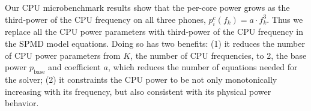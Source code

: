 Our CPU microbenchmark results show  that 
the per-core power grows as the third-power of the CPU
frequency on all three phones, 
\ie $p_i^c(f_k) = a\cdot f_k^3$. 
Thus we replace all the CPU power parameters with
third-power of the CPU frequency in the SPMD model equations.
%
Doing so has two benefits: (1) it reduces the number of CPU power
parameters from $K$, the number of CPU frequencies, to 2, the base power $p_{\text{base}}$
and coefficient $a$, which reduces the number of equations needed for
the solver; (2) it constraints the CPU power to be not only
monotonically increasing with its frequency, but also consistent with its physical power behavior.

